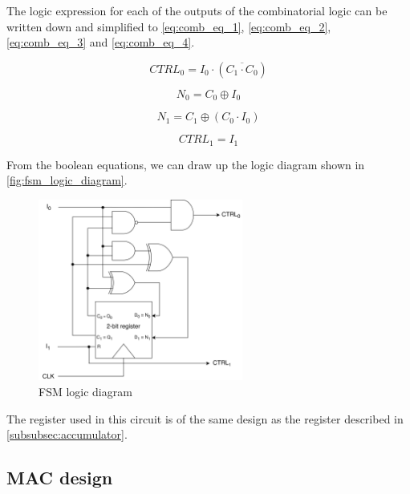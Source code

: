 \noindent
The logic expression for each of the outputs of the combinatorial logic can be written down and simplified to \autoref{eq:comb_eq_1}, \ref{eq:comb_eq_2}, \ref{eq:comb_eq_3} and \ref{eq:comb_eq_4}.

\begin{equation}
\label{eq:comb_eq_1}
    CTRL_0 = I_0\cdot(\overline{C_1 \cdot C_0})
\end{equation}

\begin{equation}
\label{eq:comb_eq_2}
    N_0 = C_0 \oplus I_0
\end{equation}

\begin{equation}
\label{eq:comb_eq_3}
    N_1 = C_1 \oplus (C_0 \cdot I_0)
\end{equation}

\begin{equation}
\label{eq:comb_eq_4}
    CTRL_1 = I_1
\end{equation}

From the boolean equations, we can draw up the logic diagram shown in \autoref{fig:fsm_logic_diagram}.

\begin{figure}[H]
    \centering
    \includegraphics[width=0.6\textwidth]{Figures/logic diagram.png}
    \caption{FSM logic diagram}
    \label{fig:fsm_logic_diagram}
\end{figure}

\noindent
The register used in this circuit is of the same design as the register described in \autoref{subsubsec:accumulator}.

\subsection{MAC design}
\label{subsec:circuitDesign}

